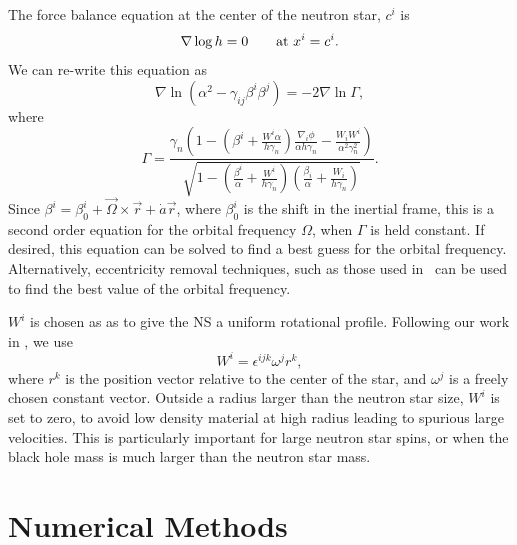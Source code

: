 The force balance equation at the center of the neutron star, $c^i$ is 
\begin{equation}
\nabla\log h=0 \qquad {\rm at}~x^i=c^i.
\end{equation}
We can re-write this equation as~\cite{Tichy:2011gw} 
 \begin{equation}
\label{eq:OmegaDriver}
\nabla\ln\left(\alpha^2-\gamma_{ij}\beta^{i}\beta^{j}\right)=-2\nabla\ln\Gamma,
\end{equation}
where
\begin{equation}
\Gamma
=\frac{\gamma_n\left(1-\left(\beta^i+\frac{W^i\alpha}{h\gamma_n}\right)\frac{\nabla_i\phi}{\alpha
    h\gamma_n}- \frac{W_i W^i}{\alpha^2\gamma_n^2}\right) } { \sqrt{ 1
    - \left(\frac{\beta^i}{\alpha}+\frac{W^i}{h\gamma_n}\right)
    \left(\frac{\beta_i}{\alpha}+\frac{W_i}{h\gamma_n}\right) } }.
\end{equation}
Since $\beta^i=\beta^i_0 +
\vec{\Omega}\times\vec{r} + \dot{a}\vec{r}$, where $\beta^i_0$ is the
shift in the inertial frame,
this is a second order equation for the orbital
frequency $\Omega$, when $\Gamma$ is held constant. If desired, this equation can be solved to find a
best guess for the orbital frequency. Alternatively, eccentricity
removal techniques, such as those used in~\cite{Buonanno:2010yk,Tacik:2015tja} can be
used to find the best value of the orbital frequency.

$W^i$ is chosen as as to give the NS a uniform rotational
profile. Following our work in \cite{Tacik:2015tja}, we use
\begin{equation}
\label{eq:RotationTerm}
W^i=\epsilon^{ijk}\omega^jr^k,
\end{equation}
where $r^k$ is the position vector relative to the center of the star,
and $\omega^j$ is a freely chosen constant vector. Outside a radius
larger than the neutron star size, $W^i$ is set to zero, to avoid low
density material at high radius leading to spurious large velocities.
This is particularly important for large neutron star spins, or when
the black hole mass is much larger than the neutron star mass.




\section{Numerical Methods}
\label{sec:BHNSNumMethods}

